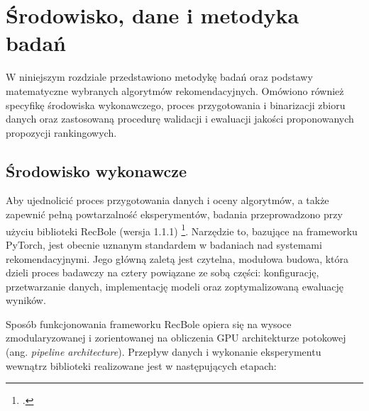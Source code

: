 \section{Środowisko, dane i metodyka badań}

W niniejszym rozdziale przedstawiono metodykę badań oraz podstawy matematyczne wybranych algorytmów rekomendacyjnych. Omówiono również specyfikę  środowiska wykonawczego, proces przygotowania i binarizacji zbioru danych oraz zastosowaną procedurę walidacji i ewaluacji jakości proponowanych propozycji rankingowych.

\subsection{Środowisko wykonawcze} %

Aby ujednolicić proces przygotowania danych i oceny algorytmów, a także zapewnić pełną powtarzalność eksperymentów, badania przeprowadzono przy użyciu biblioteki RecBole (wersja 1.1.1) \footcite{zhaoRecBoleUnifiedComprehensive2020}. Narzędzie to, bazujące na frameworku PyTorch, jest obecnie uznanym standardem w badaniach nad systemami rekomendacyjnymi. Jego główną zaletą jest czytelna, modułowa budowa, która dzieli proces badawczy na cztery powiązane ze sobą części: konfigurację, przetwarzanie danych, implementację modeli oraz zoptymalizowaną ewaluację wyników.

Sposób funkcjonowania frameworku RecBole opiera się na wysoce zmodularyzowanej i zorientowanej na obliczenia GPU architekturze potokowej (ang. \foreignlanguage{english}{\textit{pipeline architecture}}). Przepływ danych i wykonanie eksperymentu wewnątrz biblioteki realizowane jest w następujących etapach:

